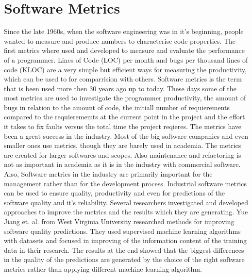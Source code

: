 \section{Software Metrics}
Since the late 1960s, when the software engineering was in it’s beginning, people wanted to measure and produce numbers to characterise code properties. 
The first metrics where used and developed to measure and evaluate the performance of a programmer. Lines of Code (LOC) per month and bugs per thousand lines of code (KLOC) are a very simple but efficient ways for measuring the productivity, which can be used to for comparrision with others.
Software metrics is the term that is been used more then 30 years ago up to today. 
These days some of the most metrics are used to investigate the programmer productivity, the amount of bugs in relation to the amount of code, the initiall number of requierements compared to the requierememts at the current point in the project and the effort it takes to fix faults versus the total time the project reqieres. \cite{kaner2004software}
The metrics have been a great success in the industry. Most of the big software companies and even smaller ones use metrics, though they are barely used in academia. 
The metrics are created for larger softwares and scopes. Also maintenance and refactoring is not as important in academia as it is in the industry with commercial software. Also, Software metrics in the industry are primarily important for the management rather than for the development process. 
Industrial software metrics can be used to ensure quality, productivity and even for predictions of the software quality and it’s reliability. 
\cite{fenton1999software}
Several researchers investigated and developed approaches to improve the metrics and the results which they are generating. 
Yue Jiang et. al. from West Virginia University researched methods for improving software quality predictions. They used supervised machine learning algorithms with datasets and focused in improving of the information content of the training data in their research. The results at the end showed that the biggest differences in the quality of the predictions are generated by the choice of the right software metrics rather than applying different machine learning algorithm. 
\cite{jiang2008comparing} 


